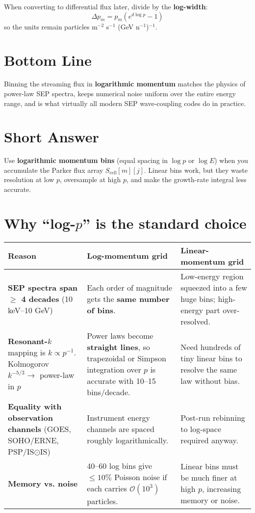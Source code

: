 \bigskip

When converting to differential flux later, divide by the \textbf{log-width}:
\[
\Delta p_m = p_m \left(e^{d\log p} - 1\right)
\]
so the units remain particles m$^{-2}$ s$^{-1}$ (GeV n$^{-1}$)$^{-1}$.

\bigskip

\section*{Bottom Line}

Binning the streaming flux in \textbf{logarithmic momentum} matches the physics of power-law SEP spectra, keeps numerical noise uniform over the entire energy range, and is what virtually all modern SEP wave-coupling codes do in practice.


\section*{Short Answer}

Use \textbf{logarithmic momentum bins} (equal spacing in $\log p$ or $\log E$) when you accumulate the Parker flux array $S_{\text{cell}}[m][j]$.
Linear bins work, but they waste resolution at low $p$, oversample at high $p$, and make the growth-rate integral less accurate.

\bigskip

\section*{Why ``log-$p$'' is the standard choice}

\begin{tabular}{|p{5.3cm}|p{5.8cm}|p{5.8cm}|}
\hline
\textbf{Reason} & \textbf{Log-momentum grid} & \textbf{Linear-momentum grid} \\
\hline
\textbf{SEP spectra span $\geq$ 4 decades} (10 keV--10 GeV) & Each order of magnitude gets the \textbf{same number of bins}. & Low-energy region squeezed into a few huge bins; high-energy part over-resolved. \\
\hline
\textbf{Resonant-$k$} mapping is $k \propto p^{-1}$. Kolmogorov $k^{-5/3} \rightarrow$ power-law in $p$ & Power laws become \textbf{straight lines}, so trapezoidal or Simpson integration over $p$ is accurate with 10--15 bins/decade. & Need hundreds of tiny linear bins to resolve the same law without bias. \\
\hline
\textbf{Equality with observation channels} (GOES, SOHO/ERNE, PSP/IS$\odot$IS) & Instrument energy channels are spaced roughly logarithmically. & Post-run rebinning to log-space required anyway. \\
\hline
\textbf{Memory vs. noise} & 40--60 log bins give $\leq 10\%$ Poisson noise if each carries $\mathcal{O}(10^3)$ particles. & Linear bins must be much finer at high $p$, increasing memory or noise. \\
\hline
\end{tabular}

